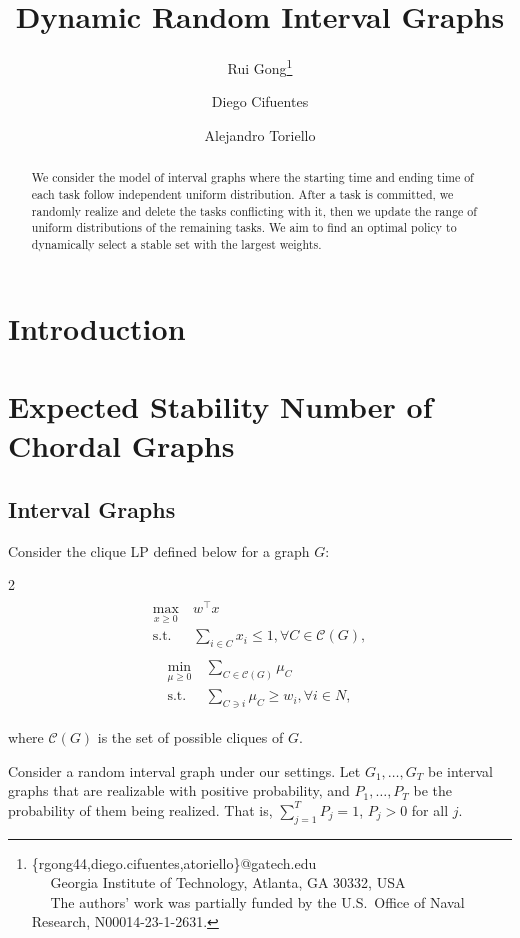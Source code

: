 \documentclass{article}
\title{Dynamic Random Interval Graphs} %
\author{Rui Gong\thanks{
\{rgong44,diego.cifuentes,atoriello\}@gatech.edu\\
\indent~~ Georgia Institute of Technology, Atlanta, GA 30332, USA\\
\indent~~ The authors' work was partially funded by the U.S.\ Office of Naval Research, N00014-23-1-2631.} \and 
Diego Cifuentes\footnotemark[1] \and 
Alejandro Toriello\footnotemark[1]}
\begin{document}
\maketitle
\begin{abstract}
    We consider the model of interval graphs where the starting time and ending time of each task follow independent uniform distribution.
    After a task is committed, we randomly realize and delete the tasks conflicting with it, then we update the range of uniform distributions of the remaining tasks.
    We aim to find an optimal policy to dynamically select a stable set with the largest weights.
\end{abstract}
\section{Introduction}

\section{Expected Stability Number of Chordal Graphs}
\subsection{Interval Graphs}
Consider the clique LP defined below for a graph $G$:
\begin{multicols}{2}
\noindent
\begin{align*}
\begin{split}
    \max_{x\geq 0} &\ w^{\top}x\\
    \text{s.t.} &\ \sum_{i\in C} x_i\leq 1,\forall C\in \mathcal{C}(G),
\end{split}
\end{align*}
\columnbreak
\begin{align*}
\begin{split}
    \min_{\mu\geq 0}&\ \sum_{C\in \mathcal{C}(G)}\mu_{C}\\
    \text{s.t.} &\ \sum_{C\ni i}\mu_C\geq w_i,\forall i\in N,
\end{split}
\end{align*}
\end{multicols}
where $\mathcal{C}(G)$ is the set of possible cliques of $G$.

Consider a random interval graph under our settings.
Let $G_1,\ldots,G_T$ be interval graphs that are realizable with positive probability, and $P_1,\ldots,P_T$ be the probability of them being realized. 
That is, $\sum_{j=1}^{T}P_j=1$, $P_j>0$ for all $j$.
\end{document}
